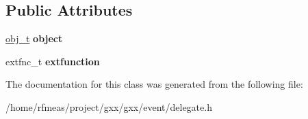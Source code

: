 \subsection*{Public Attributes}
\begin{DoxyCompactItemize}
\item 
\hyperlink{classgxx_1_1AbstractDelegate}{obj\+\_\+t} {\bfseries object}\hypertarget{classgxx_1_1fastdelegate_a64b90c0bab635e4f1e09b1d232bb9d75}{}\label{classgxx_1_1fastdelegate_a64b90c0bab635e4f1e09b1d232bb9d75}

\item 
extfnc\+\_\+t {\bfseries extfunction}\hypertarget{classgxx_1_1fastdelegate_a4d5c926bb2fcc60f27a87590af91805b}{}\label{classgxx_1_1fastdelegate_a4d5c926bb2fcc60f27a87590af91805b}

\end{DoxyCompactItemize}


The documentation for this class was generated from the following file\+:\begin{DoxyCompactItemize}
\item 
/home/rfmeas/project/gxx/gxx/event/delegate.\+h\end{DoxyCompactItemize}

